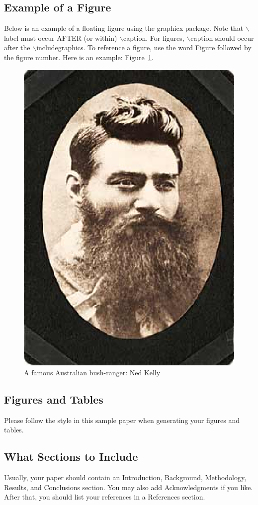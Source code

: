 \documentclass[conference]{IEEEtran}
\begin{document}
\subsection{Example of a Figure}
Below is an example of a floating figure using the graphicx
package.  Note that $\backslash$label must occur AFTER (or within)
$\backslash$caption.  For figures, $\backslash$caption should occur
after the $\backslash$includegraphics.  To reference a figure, use
the word Figure followed by the figure number.  Here is an example:
Figure~\ref{figure-fig1}.

\begin{figure}[htp]
\centerline{\includegraphics[width=0.6\columnwidth]{NedKelly.eps}}
\caption{A famous Australian bush-ranger: Ned Kelly}
\label{figure-fig1}
\end{figure}

\subsection{Figures and Tables}
Please follow the style in this sample paper when generating your figures
and tables.

\subsection{What Sections to Include}
Usually, your paper should contain an Introduction, Background,
Methodology, Results, and Conclusions section.  You may also add
Acknowledgments if you like.  After that, you should list your references
in a References section.
\end{document}
